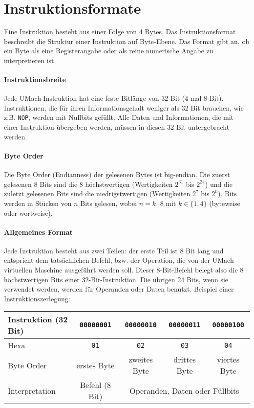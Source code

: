 \section{Instruktionsformate}
\label{sec:Instruktionsformate}

Eine Instruktion besteht aus einer Folge von 4 Bytes.
Das \gls{Instruktionsformat} beschreibt die Struktur einer Instruktion auf
Byte-Ebene. Das Format gibt an, ob ein Byte als eine Registerangabe oder als reine
numerische Angabe zu interpretieren ist.

\paragraph{Instruktionsbreite}
Jede UMach-Instruktion hat eine feste Bitlänge von 32 Bit (4 mal 8 Bit).
Instruktionen, die für ihren
Informationsgehalt weniger als 32 Bit brauchen, wie z.B. \texttt{NOP},
werden mit Nullbits gefüllt. Alle Daten und Informationen, die mit einer
Instruktion übergeben werden, müssen in diesen 32 Bit untergebracht werden.

\paragraph{Byte Order}
Die Byte Order (Endianness) der gelesenen \glspl{Byte} ist big-endian.
Die zuerst gelesenen 8 Bits sind die 8 höchstwertigen (Wertigkeiten $2^{31}$ bis
$2^{24}$) und die zuletzt gelesenen Bits sind die niedrigstwertigen
(Wertigkeiten $2^{7}$ bis $2^{0}$).
Bits werden in Stücken von $n$ Bits gelesen, wobei $n = k \cdot 8$ mit
$k \in \{1, 4\}$ (byteweise oder wortweise).


\paragraph{Allgemeines Format}
Jede \gls{Instruktion} besteht aus zwei Teilen: der erste Teil ist
8 Bit lang und entspricht dem tatsächlichen \gls{Befehl}, bzw. der Operation,
die von der UMach virtuellen Maschine ausgeführt werden soll.
Dieser 8-Bit-Befehl belegt also die 8 höchstwertigen Bits einer
32-Bit-Instruktion.  Die übrigen 24 Bits, wenn sie verwendet werden, werden
für Operanden oder Daten benutzt. Beispiel einer Instruktionszerlegung:

\begin{center}
  \begin{tabular}{|l|*{4}{c|}}
    \hline
    Instruktion (32 Bit) &
    \texttt{00000001} & \texttt{00000010} & \texttt{00000011} & \texttt{00000100}
    \\\hline
    Hexa  &
    \texttt{01}   & \texttt{02}   & \texttt{03}   & \texttt{04}
    \\\hline
    Byte Order &
    erstes Byte   & zweites Byte  & drittes Byte  & viertes Byte
    \\\hline
    Interpretation &
    Befehl (8 Bit) &  \multicolumn{3}{c|}{Operanden, Daten oder Füllbits}
    \\\hline
  \end{tabular}
\end{center}

